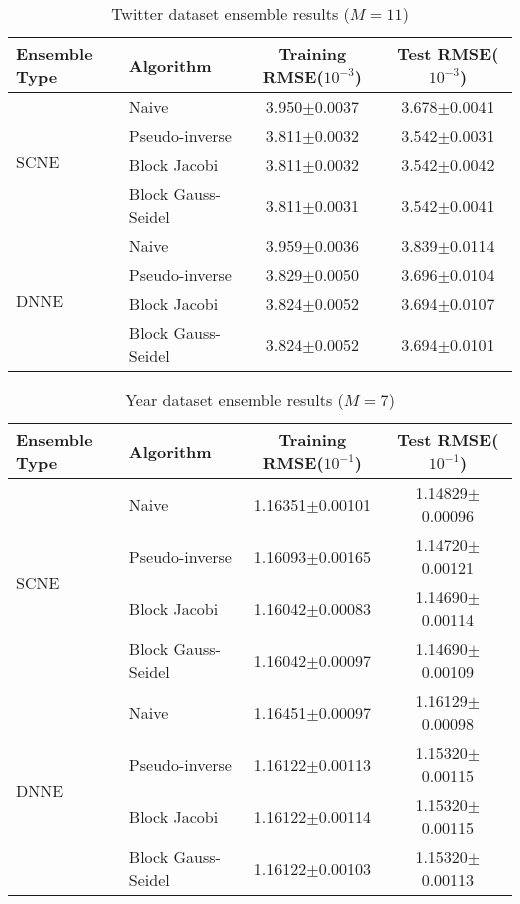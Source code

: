 \documentclass{article}
\begin{document}
\begin{table}[H]
\footnotesize 
\centering
\caption{Twitter dataset ensemble results ($M =11$)}
\label{Table08}
\begin{tabular}{l|lcc}
\hline
Ensemble Type                  & Algorithm         & Training RMSE($10^{-3}$) & Test RMSE($10^{-3}$) \\  \hline
\multirow{4}{*}{SCNE}  & Naive             & 3.950$\pm$0.0037   & 3.678$\pm$0.0041  \\
                               & Pseudo-inverse    & 3.811$\pm$0.0032   & 3.542$\pm$0.0031  \\
                               & Block Jacobi      & 3.811$\pm$0.0032   & 3.542$\pm$0.0042  \\
                               & Block Gauss-Seidel & 3.811$\pm$0.0031   & 3.542$\pm$0.0041  \\ \hline
\multirow{4}{*}{DNNE} & Naive             & 3.959$\pm$0.0036   & 3.839$\pm$0.0114  \\  
                               & Pseudo-inverse    & 3.829$\pm$0.0050   & 3.696$\pm$0.0104  \\
                               & Block Jacobi      & 3.824$\pm$0.0052   & 3.694$\pm$0.0107  \\
                               & Block Gauss-Seidel & 3.824$\pm$0.0052   & 3.694$\pm$0.0101  \\ \hline
\end{tabular}
\end{table}
\begin{table}[H]
\footnotesize 
\centering
\caption{Year dataset ensemble results ($M =7$)}
\label{Table09}
\begin{tabular}{l|lcc}
\hline
Ensemble Type             & Algorithm & Training RMSE($10^{-1}$) & Test RMSE($10^{-1}$) \\
\hline
\multirow{4}{*}{SCNE}  & Naive             & 1.16351$\pm$0.00101  & 1.14829$\pm$0.00096 \\
                               & Pseudo-inverse    & 1.16093$\pm$0.00165  & 1.14720$\pm$0.00121 \\
                               & Block Jacobi      & 1.16042$\pm$0.00083  & 1.14690$\pm$0.00114 \\
                               & Block Gauss-Seidel & 1.16042$\pm$0.00097  & 1.14690$\pm$0.00109 \\\hline
\multirow{4}{*}{DNNE} & Naive             & 1.16451$\pm$0.00097  & 1.16129$\pm$0.00098 \\
                               & Pseudo-inverse    & 1.16122$\pm$0.00113  & 1.15320$\pm$0.00115 \\
                               & Block Jacobi      & 1.16122$\pm$0.00114  & 1.15320$\pm$0.00115 \\
                               & Block Gauss-Seidel & 1.16122$\pm$0.00103  & 1.15320$\pm$0.00113 \\
\hline
\end{tabular}
\end{table}
\end{document}

